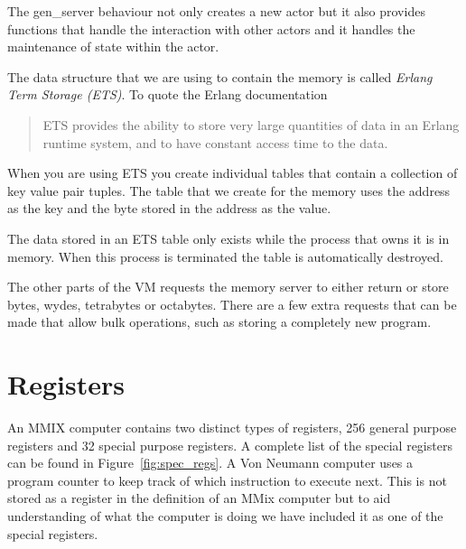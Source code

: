 \documentclass[a4paper,11pt]{report}
\begin{document}
The gen\_server behaviour not only creates a new actor but it also provides functions that handle the interaction with other actors and it handles the maintenance of state within the actor.

The data structure that we are using to contain the memory is called \textit{Erlang Term Storage (ETS)}. To quote the Erlang documentation
\begin{quote}
ETS provides the ability to store very large quantities of data in an Erlang runtime system, and to have constant access time to the data.
\end{quote}

When you are using ETS you create individual tables that contain a collection of key value pair tuples. The table that we create for the memory uses the address as the key and the byte stored in the address as the value.

The data stored in an ETS table only exists while the process that owns it is in memory. When this process is terminated the table is automatically destroyed.

The other parts of the VM requests the memory server to either return or store bytes, wydes, tetrabytes or octabytes. There are a few extra requests that can be made that allow bulk operations, such as storing a completely new program.

\section{Registers}\label{registers}
An MMIX computer contains two distinct types of registers, 256 general purpose registers and 32 special purpose registers. A complete list of the special registers can be found in Figure~\ref{fig:spec_regs}. A Von Neumann computer uses a program counter to keep track of which instruction to execute next. This is not stored as a register in the definition of an MMix computer but to aid understanding of what the computer is doing we have included it as one of the special registers.
\end{document}
